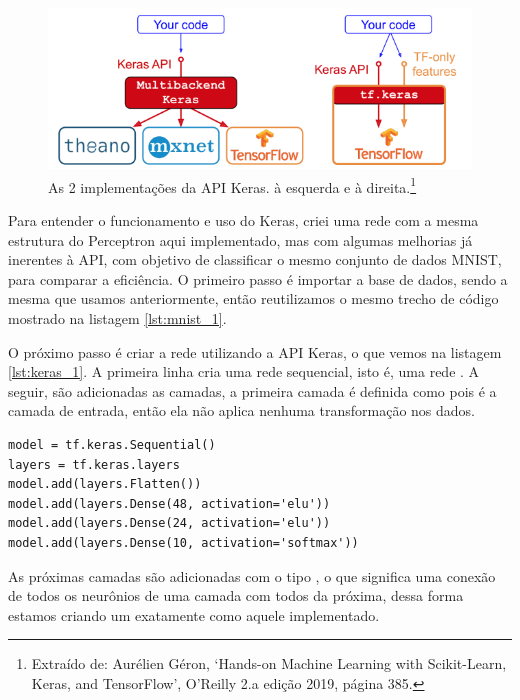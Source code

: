 \begin{figure}[htb]
\centering
\includegraphics[width=12cm]{figuras/tensor_flow}
\caption{As 2 implementações da API Keras.  à esquerda e  à direita.\footnote{Extraído de: Aurélien Géron, `Hands-on Machine Learning with Scikit-Learn, Keras, and TensorFlow', O'Reilly 2.a edição 2019, página 385.}}
\label{fig:tensor_flow}
\end{figure}

Para entender o funcionamento e uso do Keras, criei uma rede com a mesma estrutura do Perceptron aqui implementado, mas com algumas melhorias já inerentes à API, com objetivo de classificar o mesmo conjunto de dados MNIST, para comparar a eficiência. O primeiro passo é importar a base de dados, sendo a mesma que usamos anteriormente, então reutilizamos o mesmo trecho de código mostrado na listagem \ref{lst:mnist_1}.

O próximo passo é criar a rede utilizando a API Keras, o que vemos na listagem \ref{lst:keras_1}. A primeira linha cria uma rede sequencial, isto é, uma rede . A seguir, são adicionadas as camadas, a primeira camada é definida como  pois é a camada de entrada, então ela não aplica nenhuma transformação nos dados.

\begin{scriptsize}
\estiloR
\begin{lstlisting}[caption={Trecho do script \eng{mnist\_keras.py}},label={lst:keras_1},escapeinside={\%}]
model = tf.keras.Sequential()
layers = tf.keras.layers
model.add(layers.Flatten())
model.add(layers.Dense(48, activation='elu'))
model.add(layers.Dense(24, activation='elu'))
model.add(layers.Dense(10, activation='softmax'))
\end{lstlisting}
\end{scriptsize}

As próximas camadas são adicionadas com o tipo , o que significa uma conexão de todos os neurônios de uma camada com todos da próxima, dessa forma estamos criando um  exatamente como aquele implementado. 

